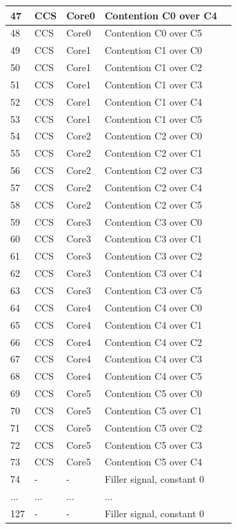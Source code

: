 \begin{table}[H]
\begin{tiny}
\begin{tabular}{|l|l|l|l|l|}
			\hline 
			47 & CCS & Core0 &  Contention C0 over C4\\
			\hline 
			48 & CCS & Core0 &  Contention C0 over C5\\
			\hline 
			49 & CCS & Core1 &  Contention C1 over C0\\
			\hline 
			50 & CCS & Core1 &  Contention C1 over C2\\
			\hline 
			51 & CCS & Core1 &  Contention C1 over C3\\
			\hline 
			52 & CCS & Core1 &  Contention C1 over C4\\
			\hline 
			53 & CCS & Core1 &  Contention C1 over C5\\
			\hline 
			54 & CCS & Core2 &  Contention C2 over C0\\
			\hline 
			55 & CCS & Core2 &  Contention C2 over C1\\
			\hline 
			56 & CCS & Core2 &  Contention C2 over C3\\
			\hline 
			57 & CCS & Core2 &  Contention C2 over C4\\
			\hline 
			58 & CCS & Core2 &  Contention C2 over C5\\
			\hline 
			59 & CCS & Core3 &  Contention C3 over C0\\
			\hline 
			60 & CCS & Core3 &  Contention C3 over C1\\
			\hline 
			61 & CCS & Core3 &  Contention C3 over C2\\
			\hline 
			62 & CCS & Core3 &  Contention C3 over C4\\
			\hline 
			63 & CCS & Core3 &  Contention C3 over C5\\
			\hline 
			64 & CCS & Core4 &  Contention C4 over C0\\
			\hline 
			65 & CCS & Core4 &  Contention C4 over C1\\
			\hline 
			66 & CCS & Core4 &  Contention C4 over C2\\
			\hline 
			67 & CCS & Core4 &  Contention C4 over C3\\
			\hline 
			68 & CCS & Core4 &  Contention C4 over C5\\
			\hline 
			69 & CCS & Core5 &  Contention C5 over C0\\
			\hline 
			70 & CCS & Core5 &  Contention C5 over C1\\
			\hline 
			71 & CCS & Core5 &  Contention C5 over C2\\
			\hline 
			72 & CCS & Core5 &  Contention C5 over C3\\
			\hline 
			73 & CCS & Core5 &  Contention C5 over C4\\
			\hline 
			74 & - & - &   Filler signal, constant 0 \\
			\hline 
			... & ... & ... & ... \\
			\hline 
			127 & - & - &   Filler signal, constant 0 \\
			\hline 	
		\end{tabular}
	\end{tiny}
\end{table}
